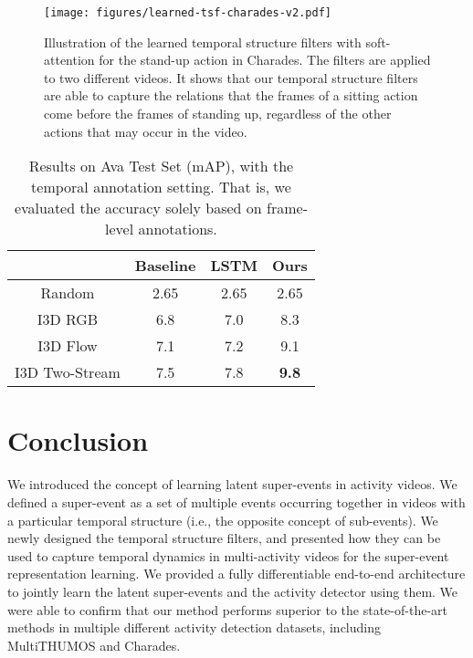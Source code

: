 \documentclass[10pt,twocolumn,letterpaper]{article}
\begin{document}
\begin{figure*}
  \centering
    \texttt{[image: figures/learned-tsf-charades-v2.pdf]}
      \caption{Illustration of the learned temporal structure filters with soft-attention for the stand-up action in Charades. The filters are applied to two different videos. It shows that our temporal structure filters are able to capture the relations that the frames of a sitting action come before the frames of standing up, regardless of the other actions that may occur in the video.}
      \label{fig:learned-charades}
\end{figure*}















\begin{table}
\caption{Results on Ava Test Set (mAP), with the temporal annotation setting. That is, we evaluated the accuracy solely based on frame-level annotations.}
\label{res:ava}
\centering
\setlength\extrarowheight{0pt}
\begin{tabular}{c|c|c|c}
\hline
 & Baseline & LSTM & Ours\\
\hline
Random     & 2.65 & 2.65 & 2.65\\
I3D RGB    &  6.8 & 7.0  & 8.3 \\
I3D Flow   &  7.1 & 7.2  & 9.1 \\
I3D Two-Stream & 7.5 & 7.8 & \bf{9.8} \\
\hline
\end{tabular}
\end{table}








\section{Conclusion}

We introduced the concept of learning latent super-events in activity videos. We defined a super-event as a set of multiple events occurring together in videos with a particular temporal structure (i.e., the opposite concept of sub-events). We newly designed the temporal structure filters, and presented how they can be used to capture temporal dynamics in multi-activity videos for the super-event representation learning. We provided a fully differentiable end-to-end architecture to jointly learn the latent super-events and the activity detector using them. We were able to confirm that our method performs superior to the state-of-the-art methods in multiple different activity detection datasets, including MultiTHUMOS and Charades.
\end{document}
